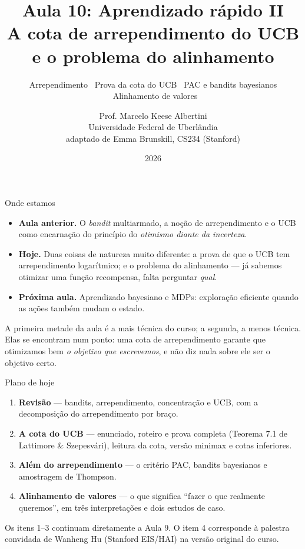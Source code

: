 \documentclass[aspectratio=169, 11pt]{beamer}
\title[Aula 10 — Aprendizado rápido II]{Aula 10: Aprendizado rápido II\\
  A cota de arrependimento do UCB e o problema do alinhamento}
\subtitle[Aprendizagem por Reforço]{Arrependimento \textbullet\ Prova da cota do UCB
  \textbullet\ PAC e bandits bayesianos \textbullet\ Alinhamento de valores}
\author[Prof. Marcelo K. Albertini]{Prof. Marcelo Keese Albertini \\
  \footnotesize Universidade Federal de Uberlândia \\
  \footnotesize adaptado de Emma Brunskill, CS234 (Stanford)}
\institute{Universidade Federal de Uberlândia}
\date{2026}
\begin{document}
\begin{frame}\titlepage\end{frame}

\begin{frame}{Onde estamos}
  \begin{itemize}
    \item \textbf{Aula anterior.} O \emph{bandit} multiarmado, a noção de
          \alert{arrependimento} e o UCB como encarnação do princípio do
          \emph{otimismo diante da incerteza}.
    \item \textbf{Hoje.} Duas coisas de natureza muito diferente: a
          \alert{prova} de que o UCB tem arrependimento logarítmico; e o
          \alert{problema do alinhamento} --- já sabemos otimizar uma função
          recompensa, falta perguntar \emph{qual}.
    \item \textbf{Próxima aula.} Aprendizado bayesiano e MDPs: exploração
          eficiente quando as ações também mudam o estado.
  \end{itemize}

  \begin{ideiabox}
    A primeira metade da aula é a mais técnica do curso; a segunda, a menos
    técnica. Elas se encontram num ponto: uma cota de arrependimento garante
    que otimizamos bem \emph{o objetivo que escrevemos}, e não diz nada sobre
    ele ser o objetivo certo.
  \end{ideiabox}
\end{frame}

\begin{frame}{Plano de hoje}
  \begin{enumerate}
    \item \textbf{Revisão} --- bandits, arrependimento, concentração e UCB, com
          a decomposição do arrependimento por braço.
    \item \textbf{A cota do UCB} --- enunciado, roteiro e prova completa
          (Teorema 7.1 de Lattimore \& Szepesvári), leitura da cota, versão
          minimax e cotas inferiores.
    \item \textbf{Além do arrependimento} --- o critério PAC, bandits
          bayesianos e amostragem de Thompson.
    \item \textbf{Alinhamento de valores} --- o que significa ``fazer o que
          realmente queremos'', em três interpretações e dois estudos de caso.
  \end{enumerate}

  \medskip
  {\small\color{rlCinza} Os itens 1--3 continuam diretamente a Aula 9. O item 4
  corresponde à palestra convidada de Wanheng Hu (Stanford EIS/HAI) na versão
  original do curso.}
\end{frame}
\end{document}
